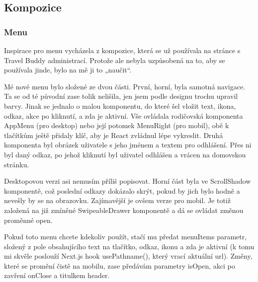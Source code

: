 \subsection{Kompozice}

\subsubsection{Menu}
Inspirace pro menu vycházela z kompozice, která se už používala na stránce s Travel Buddy administrací. Protože ale nebyla uzpůsobená na to, aby se používala jinde, bylo na mě ji to „naučit“.

Mé nové menu bylo složené ze dvou části. První, horní, byla samotná navigace. Ta se od té původní zase tolik nelišila, jen jsem podle designu trochu upravil barvy. Jinak se jednalo o malou komponentu, do které šel vložit text, ikona, odkaz, akce po kliknutí, a zda je aktivní. Vše ovládala rodičovská komponenta AppMenu (pro desktop) nebo její potomek MenuRight (pro mobil), obě k tlačítkům ještě přidaly klíč, aby je React zvládnul lépe vykreslit. Druhá komponenta byl obrázek uživatele s jeho jménem a textem pro odhlášení. Přes ni byl daný odkaz, po jehož kliknutí byl uživatel odhlášen a vrácen na domovskou stránku.

Desktopovou verzi asi nemusím příliš popisovat. Horní část byla ve ScrollShadow komponentě, což poslední odkazy dokázalo skrýt, pokud by jich bylo hodně a nevešly by se na obrazovku. Zajímavější je ovšem verze pro mobil. Je totiž založená na již zmíněné SwipeableDrawer komponentě a dá se ovládat změnou proměnné open.

Pokud toto menu chcete kdekoliv použít, stačí mu předat menuItems parametr, složený z pole obsahujícího text na tlačítko, odkaz, ikonu a zda je aktivní (k tomu mi skvěle poslouží Next.js hook usePathname(), který vrací aktuální url). Změny, které se promění čistě na mobilu, zase předávám parametry isOpen, akci po zavření onClose a titulkem header.

